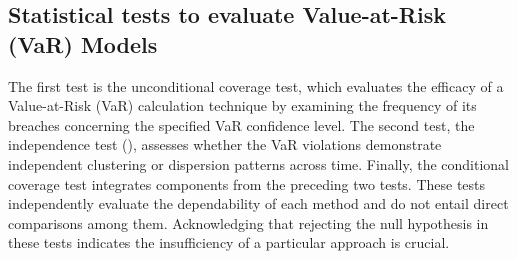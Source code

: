 \subsection{Statistical tests to evaluate Value-at-Risk (VaR) Models}\label{sec:VaR-backtesting}

The first test is the unconditional coverage test, which evaluates the efficacy of a Value-at-Risk (VaR) calculation technique by examining the frequency of its breaches concerning the specified VaR confidence level. The second test, the independence test (\cite{roccioletti2015backtesting}), assesses whether the VaR violations demonstrate independent clustering or dispersion patterns across time. Finally, the conditional coverage test integrates components from the preceding two tests. These tests independently evaluate the dependability of each method and do not entail direct comparisons among them. Acknowledging that rejecting the null hypothesis in these tests indicates the insufficiency of a particular approach is crucial.


